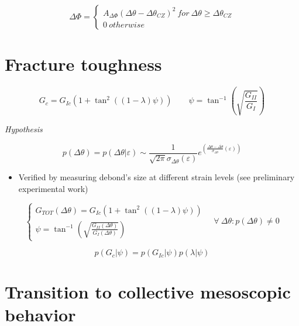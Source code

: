 \documentclass[review]{elsarticle}
\begin{document}
\begin{equation}
\Delta\Phi=\begin{cases}
A_{\Delta\Phi}\left(\Delta\theta-\Delta\theta_{CZ}\right)^{2}\ for\ \Delta\theta\geq\Delta\theta_{CZ}\\
0\ otherwise
\end{cases}
\end{equation}

\section{Fracture toughness}

\begin{equation}
G_{c}=G_{Ic}\left(1+\tan^{2}{\left(\left(1-\lambda\right)\psi\right)}\right)\qquad\psi=\tan^{-1}\left(\sqrt{\frac{G_{II}}{G_{I}}}\right)
\end{equation}

\em{Hypothesis}

\begin{equation}
p\left(\Delta\theta\right)=p\left(\Delta\theta|\varepsilon\right)\sim\frac{1}{\sqrt{2\pi}\sigma_{\Delta\theta}\left(\varepsilon\right)}e^{\left(\frac{\Delta\theta-\overline{\Delta\theta}}{\sigma_{\Delta\theta}}\left(\varepsilon\right)\right)}
\end{equation}

\begin{itemize}[$\rightarrow$]
\item Verified by measuring debond's size at different strain levels (see preliminary experimental work)\\
\end{itemize}

\begin{equation}
\begin{cases}
G_{TOT}\left(\Delta\theta\right)=G_{Ic}\left(1+\tan^{2}{\left(\left(1-\lambda\right)\psi\right)}\right)\\
\psi=\tan^{-1}\left(\sqrt{\frac{G_{II}\left(\Delta\theta\right)}{G_{I}\left(\Delta\theta\right)}}\right)
\end{cases}\quad\forall\ \Delta\theta : p(\Delta\theta)\neq 0
\end{equation}

\begin{equation}
p\left(G_{c}|\psi\right)=p\left(G_{Ic}|\psi\right)p\left(\lambda|\psi\right)
\end{equation}

\section{Transition to collective mesoscopic behavior}
\end{document}
